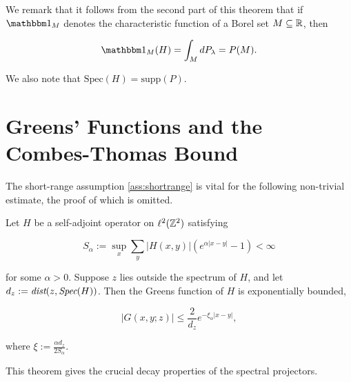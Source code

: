 \documentclass[12pt, letterpaper]{article}
\begin{document}
We remark that it follows from the second part of this theorem that if $\One_{M}$ denotes the characteristic function of a Borel set $M\subseteq \mathbb{R}$, then 

\[\One_M(H) = \int_M dP_\lambda = P(M).\]

We also note that $\text{Spec}(H) = \text{supp}(P)$.

\section{Greens' Functions and the Combes-Thomas Bound}

The short-range assumption \ref{ass:shortrange} is vital for the following non-trivial estimate, the proof of which is omitted.

\begin{theorem}
Let $H$ be a self-adjoint operator on $\ell^2(\mathbb{Z}^2)$ satisfying

\[S_\alpha := \sup_x \sum_y |H(x,y)|(e^{\alpha|x-y|}-1) < \infty\]

for some $\alpha>0$. Suppose $z$ lies outside the spectrum of $H$, and let $d_z := \emph{dist}(z,\emph{Spec}(H))$.  Then the Greens function of $H$ is exponentially bounded, 

\[|G(x,y;z)| \leq \frac{2}{d_z}e^{-\xi_\alpha|x-y|},\]

where $\xi := \frac{\alpha d_z}{2 S_\alpha}$.
\label{thm:combesthomas}
\end{theorem}

This theorem gives the crucial decay properties of the spectral projectors.
\end{document}
